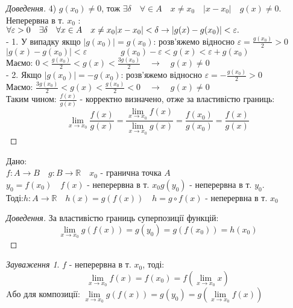 \documentclass[14pt,a4paper]{scrartcl}
\theoremstyle{definition}
\theoremstyle{remark}
\newtheorem*{remark}{Зауваження}
\theoremstyle{definition}
\theoremstyle{definition}
\begin{document}
\begin{proof}[Доведення]
  4) $g(x_0) \neq 0$, тож \quad
  $\exists \delta \quad \forall \in A \quad x \neq x_0 \quad \vert x - x_0 \vert \quad g(x) \neq 0 $.\\
  Неперервна в т. $x_0$ : \quad $\forall \varepsilon > 0 \quad \exists \delta \quad\forall x\in A \quad x\neq x_0 \\
  \vert x - x_0 \vert < \delta \rightarrow
  \vert g(x) - g(x_0) \vert < \varepsilon.\qquad$\\
  - 1. У випадку якщо $\vert g(x_0) \vert = g(x_0)$:  розв'яжемо відносно $\varepsilon = \frac{g(x_0)}{2}>0 $\\
  $\vert g(x) - g(x_0) \vert < \varepsilon
  \qquad \qquad g(x_0) - \varepsilon < g(x) < \varepsilon + g(x_0)$\\
  Маємо: $0 < \frac{g(x_0)}{2} < g(x) < \frac{3g(x_0)}{2} \quad \rightarrow \quad g(x) \neq 0$\\
  - 2. Якщо $\vert g(x_0) \vert= -g(x_0)$:  розв'яжемо відносно $\varepsilon = -\frac{g(x_0)}{2}>0 $\\
  Маємо: $ \frac{3g(x_0)}{2} < g(x) < \frac{g(x_0)}{2} < 0 \quad \rightarrow \quad g(x) \neq 0$\\
  Таким чином: $\frac{f(x)}{g(x)} $ - корректно визначено, отже за властивістю границь:
  $$ \lim\limits_{x\to x_0}{\frac{f(x)}{g(x)}} =  \frac{\lim\limits_{x\to x_0}{f(x)}}{ \lim\limits_{x\to x_0}{g(x)}} = \frac{f(x_0)}{g(x_0)} = \frac{f(x)}{g(x)}$$
\end{proof}
\pagebreak
\begin{boxteo}Дано:\\
  $f: A \to B \quad g: B \to \mathbb{R} \quad x_0$ - гранична точка $A$ \quad \\ $y_0 = f(x_0)\quad f(x)$ - неперервна в т. $x_0$\quad $g(y_0)$ - неперервна в т. $y_0$.\\
  Тоді:\quad $h: A\to \mathbb{R} \quad h(x)=g(f(x)) \quad h = g \circ f(x)$ - неперервна в т. $x_0$
\end{boxteo}
\begin{proof}[Доведення]
  За властивістю границь суперпозиції функцій:\\
  $$ \lim\limits_{x\to x_0}{g(f(x))} = g(y_0) = g(f(x_0)) = h(x_0)$$
\end{proof}
\begin{remark}
  $f$ - неперервна в т. $x_0$, тоді:
  $$ \lim\limits_{x\to x_0}{f(x)} = f(x_0) = f( \lim\limits_{x\to x_0}{x}) $$
  Aбо для композиції: \quad
  $ \lim\limits_{x\to x_0}{g(f(x))} = g(y_0) = g( \lim\limits_{x\to x_0}{f(x)} ) $
\end{remark}
\end{document}
